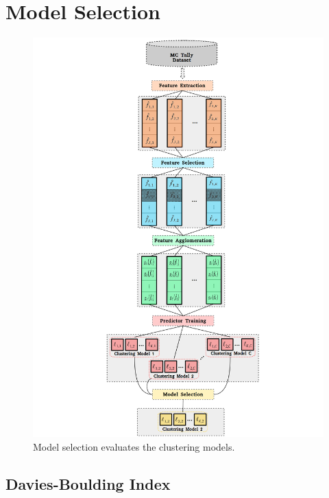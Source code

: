 \section{Model Selection}
\label{sec:chap10-model-select}

\begin{figure}[h!]
\centering
\includegraphics[width=0.95\linewidth]{figures/unsupervised/features/engineering/model}
\vspace{2mm}
\caption[\textit{i}MGXS model selection]{Model selection evaluates the clustering models.}
\label{fig:chap10-model}
\end{figure}

\subsection{Davies-Boulding Index}
\label{sec:chap10-db-index}

